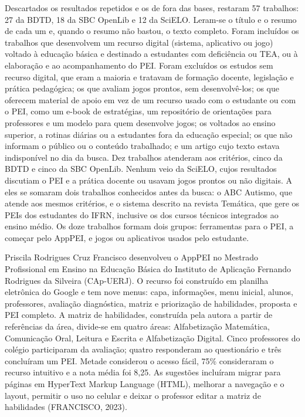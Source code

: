 Descartados os resultados repetidos e os de fora das bases, restaram 57 trabalhos: 27 da BDTD, 18 da SBC OpenLib e 12 da SciELO. Leram-se o título e o resumo de cada um e, quando o resumo não bastou, o texto completo. Foram incluídos os trabalhos que desenvolvem um recurso digital (sistema, aplicativo ou jogo) voltado à educação básica e destinado a estudantes com deficiência ou TEA, ou à elaboração e ao acompanhamento do PEI. Foram excluídos os estudos sem recurso digital, que eram a maioria e tratavam de formação docente, legislação e prática pedagógica; os que avaliam jogos prontos, sem desenvolvê-los; os que oferecem material de apoio em vez de um recurso usado com o estudante ou com o PEI, como um e-book de estratégias, um repositório de orientações para professores e um modelo para quem desenvolve jogos; os voltados ao ensino superior, a rotinas diárias ou a estudantes fora da educação especial; os que não informam o público ou o conteúdo trabalhado; e um artigo cujo texto estava indisponível no dia da busca. Dez trabalhos atenderam aos critérios, cinco da BDTD e cinco da SBC OpenLib. Nenhum veio da SciELO, cujos resultados discutiam o PEI e a prática docente ou usavam jogos prontos ou não digitais. A eles se somaram dois trabalhos conhecidos antes da busca: o ABC Autismo, que atende aos mesmos critérios, e o sistema descrito na revista Temática, que gere os PEIs dos estudantes do IFRN, inclusive os dos cursos técnicos integrados ao ensino médio. Os doze trabalhos formam dois grupos: ferramentas para o PEI, a começar pelo AppPEI, e jogos ou aplicativos usados pelo estudante.

Priscila Rodrigues Cruz Francisco desenvolveu o AppPEI no Mestrado Profissional em Ensino na Educação Básica do Instituto de Aplicação Fernando Rodrigues da Silveira (CAp-UERJ). O recurso foi construído em planilha eletrônica do Google e tem nove menus: capa, informações, menu inicial, alunos, professores, avaliação diagnóstica, matriz e priorização de habilidades, proposta e PEI completo. A matriz de habilidades, construída pela autora a partir de referências da área, divide-se em quatro áreas: Alfabetização Matemática, Comunicação Oral, Leitura e Escrita e Alfabetização Digital. Cinco professores do colégio participaram da avaliação; quatro responderam ao questionário e três concluíram um PEI. Metade considerou o acesso fácil, 75\% consideraram o recurso intuitivo e a nota média foi 8,25. As sugestões incluíram migrar para páginas em HyperText Markup Language (HTML), melhorar a navegação e o layout, permitir o uso no celular e deixar o professor editar a matriz de habilidades (FRANCISCO, 2023).

